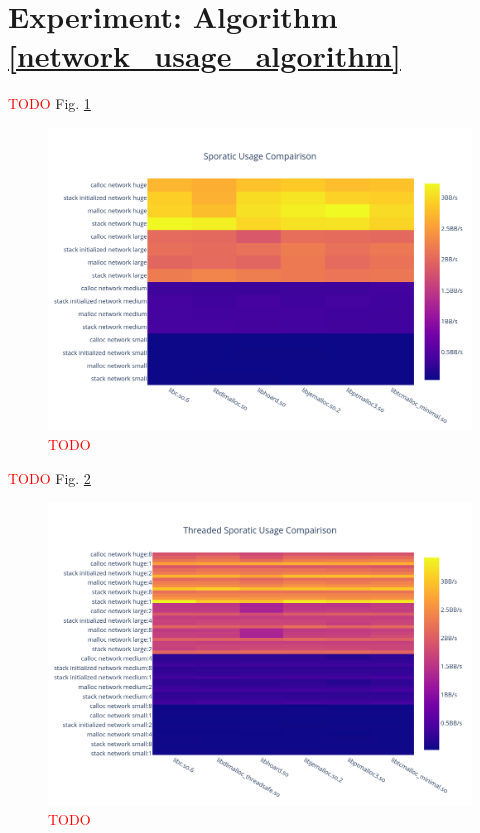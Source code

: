 \documentclass[letterpaper, 10 pt, conference]{ieeeconf}  %
\newcommand*\todo[0]{\textcolor{red}{TODO }}
\begin{document}
\section{Experiment: Algorithm \ref{network_usage_algorithm}}

\todo Fig. \ref{algo3_complete_hist}

\begin{figure}[tbh!]
  \centering
  \includegraphics[width=\columnwidth]{graphs/sporatic_hist.png}
  \caption{ \todo }
  \label{algo3_complete_hist}
\end{figure}

\todo Fig. \ref{algo3_complete_threaded_hist}

\begin{figure}[tbh!]
  \centering
  \includegraphics[width=\columnwidth]{graphs/sporatic_threaded_hist.png}
  \caption{ \todo }
  \label{algo3_complete_threaded_hist}
\end{figure}
\end{document}

